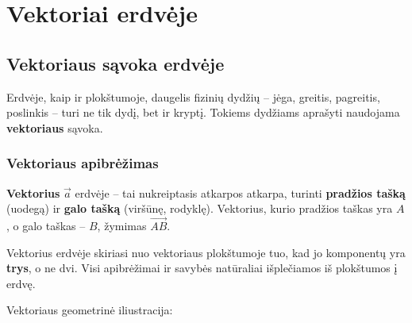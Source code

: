 \chapter{Vektoriai erdvėje}

\section{Vektoriaus sąvoka erdvėje}

Erdvėje, kaip ir plokštumoje, daugelis fizinių dydžių -- jėga, greitis, pagreitis, poslinkis -- 
turi ne tik dydį, bet ir kryptį. Tokiems dydžiams aprašyti naudojama \textbf{vektoriaus} sąvoka.

\subsection{Vektoriaus apibrėžimas}

\begin{definition}
\textbf{Vektorius} $\vec{a}$ erdvėje -- tai nukreiptasis atkarpos atkarpa, turinti 
\textbf{pradžios tašką} (uodegą) ir \textbf{galo tašką} (viršūnę, rodyklę).
Vektorius, kurio pradžios taškas yra $A$, o galo taškas -- $B$, žymimas $\overrightarrow{AB}$.
\end{definition}

\begin{remark}
Vektorius erdvėje skiriasi nuo vektoriaus plokštumoje tuo, kad jo komponentų yra 
\textbf{trys}, o ne dvi. Visi apibrėžimai ir savybės natūraliai išplečiamos iš 
plokštumos į erdvę.
\end{remark}

Vektoriaus geometrinė iliustracija:

\begin{center}
\end{center}

